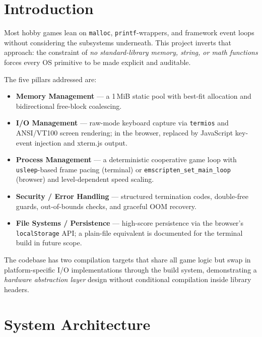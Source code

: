 \documentclass[conference]{IEEEtran}
\begin{document}
\section{Introduction}

Most hobby games lean on \texttt{malloc}, \texttt{printf}-wrappers, and
framework event loops without considering the subsystems underneath. This
project inverts that approach: the constraint of \emph{no standard-library
memory, string, or math functions} forces every OS primitive to be made
explicit and auditable.

The five pillars addressed are:

\begin{itemize}
  \item \textbf{Memory Management} --- a 1\,MiB static pool with best-fit
        allocation and bidirectional free-block coalescing.
  \item \textbf{I/O Management} --- raw-mode keyboard capture via
        \texttt{termios} and ANSI/VT100 screen rendering; in the browser,
        replaced by JavaScript key-event injection and xterm.js output.
  \item \textbf{Process Management} --- a deterministic cooperative game loop
        with \texttt{usleep}-based frame pacing (terminal) or
        \texttt{emscripten\_set\_main\_loop} (browser) and level-dependent
        speed scaling.
  \item \textbf{Security / Error Handling} --- structured termination codes,
        double-free guards, out-of-bounds checks, and graceful OOM recovery.
  \item \textbf{File Systems / Persistence} --- high-score persistence via the
        browser's \texttt{localStorage} API; a plain-file equivalent is
        documented for the terminal build in future scope.
\end{itemize}

The codebase has two compilation targets that share all game logic but swap in
platform-specific I/O implementations through the build system, demonstrating
a \emph{hardware abstraction layer} design without conditional compilation
inside library headers.

\section{System Architecture}
\end{document}

